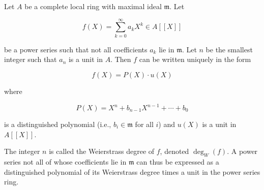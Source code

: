 Let $A$ be a complete local ring with maximal ideal $\mathfrak{m}$. Let

$$f(X) = \sum_{k=0}^{\infty} a_k X^k \in A[[X]]$$

be a power series such that not all coefficients $a_k$ lie in $\mathfrak{m}$. Let $n$ be the smallest integer such that $a_n$ is a unit in $A$. Then $f$ can be written uniquely in the form

$$f(X) = P(X) \cdot u(X)$$

where

$$P(X) = X^n + b_{n-1} X^{n-1} + \cdots + b_0$$

is a distinguished polynomial (i.e., $b_i \in \mathfrak{m}$ for all $i$) and $u(X)$ is a unit in $A[[X]]$.

The integer $n$ is called the Weierstrass degree of $f$, denoted $\deg_W(f)$. A power series not all of whose coefficients lie in $\mathfrak{m}$ can thus be expressed as a distinguished polynomial of its Weierstrass degree times a unit in the power series ring.
